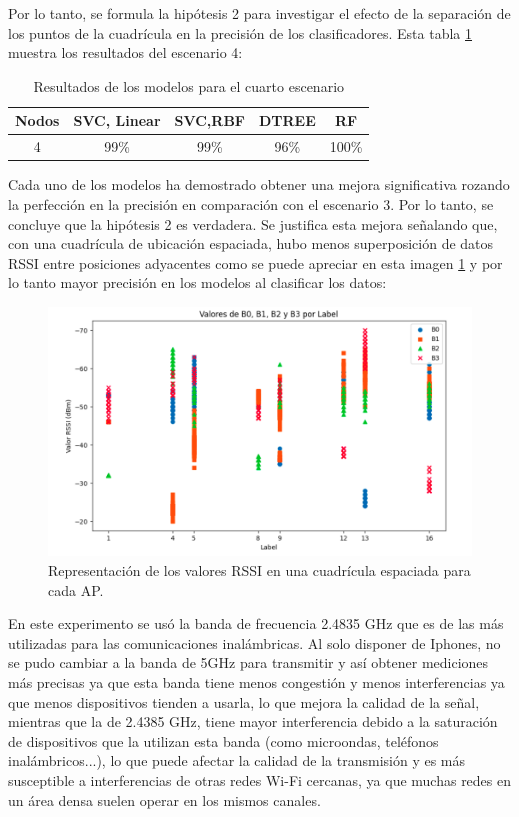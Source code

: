 Por lo tanto, se formula la hipótesis 2 para investigar el efecto de la separación de los puntos de la cuadrícula en la precisión de los clasificadores. Esta tabla \ref{cuadro:tabla2} muestra los resultados del escenario 4:

\begin{table}[H]
\begin{center}
\begin{tabular}{|c|c|c|c|c|}
\hline
\textbf{Nodos} & \textbf{SVC, Linear} & \textbf{SVC,RBF} & \textbf{DTREE} & \textbf{RF} \\
\hline
4 & 99\% & 99\% & 96\% & 100\% \\  
\hline
\end{tabular}
\caption{Resultados de los modelos para el cuarto escenario}
\label{cuadro:tabla2}
\end{center}
\end{table}


Cada uno de los modelos ha demostrado obtener una mejora significativa rozando la perfección en la precisión en comparación con el escenario 3. Por lo tanto, se concluye que la hipótesis 2 es verdadera. Se justifica esta mejora señalando que, con una cuadrícula de ubicación espaciada, hubo menos superposición de datos RSSI entre posiciones adyacentes como se puede apreciar en esta imagen \ref{fig:vals2} y por lo tanto mayor precisión en los modelos al clasificar los datos:

\begin{figure}[H]
  \centering
  \includegraphics[scale=0.4]{figs/vals2} %
  \caption{ Representación de los valores RSSI en una cuadrícula espaciada para cada AP.}
  \label{fig:vals2}
\end{figure} 

En este experimento se usó la banda de frecuencia 2.4835 GHz que es de las más utilizadas para las comunicaciones inalámbricas. Al solo disponer de Iphones, no se pudo cambiar a la banda de 5GHz para transmitir y así obtener mediciones más precisas ya que esta banda tiene menos congestión y menos interferencias ya que menos dispositivos tienden a usarla, lo que mejora la calidad de la señal, mientras que la de 2.4385 GHz, tiene mayor interferencia debido a la saturación de dispositivos que la utilizan esta banda (como microondas, teléfonos inalámbricos...), lo que puede afectar la calidad de la transmisión y es más susceptible a interferencias de otras redes Wi-Fi cercanas, ya que muchas redes en un área densa suelen operar en los mismos canales.

